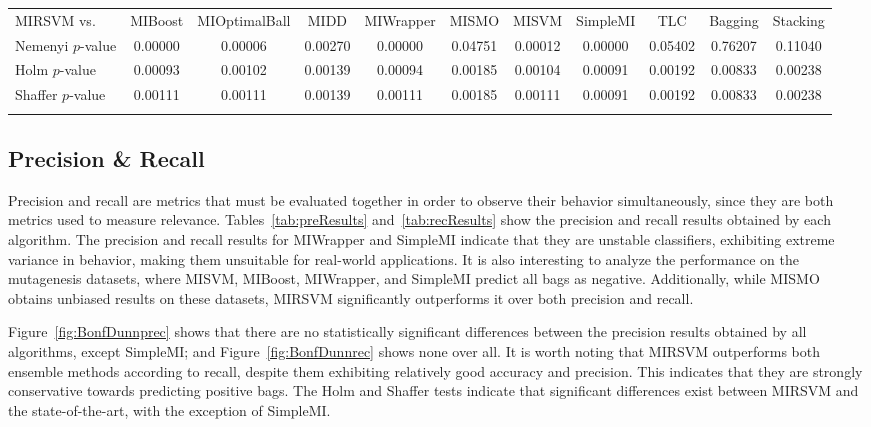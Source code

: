 \begin{table}[th!]
{}
\label{fig:BonfDunnacc}
\label{tab:statacc}
\scriptsize
\begin{tabularx}{\textwidth}{lcccccccccc}\noalign{\smallskip}\hline\noalign{\smallskip}
MIRSVM vs. & MIBoost & MIOptimalBall & MIDD & MIWrapper & MISMO & MISVM & SimpleMI & TLC & Bagging & Stacking\\
\noalign{\smallskip}\hline\noalign{\smallskip}
Nemenyi $p$-value & 0.00000 & 0.00006 & 0.00270 & 0.00000 & 0.04751 & 0.00012 & 0.00000 & 0.05402 & 0.76207 & 0.11040\\
Holm $p$-value & 0.00093 & 0.00102 & 0.00139 & 0.00094 & 0.00185 & 0.00104 & 0.00091 & 0.00192 & 0.00833 & 0.00238\\
Shaffer $p$-value & 0.00111 & 0.00111 & 0.00139 & 0.00111 & 0.00185 & 0.00111 & 0.00091 & 0.00192 & 0.00833 & 0.00238\\
\noalign{\smallskip}\hline\noalign{\smallskip}
\end{tabularx}
\end{table}
\newpage
\subsection{Precision \& Recall}
Precision and recall are metrics that must be evaluated together in order to observe their behavior simultaneously, since they are both metrics used to measure relevance. Tables~\ref{tab:preResults} and~\ref{tab:recResults} show the precision and recall results obtained by each algorithm. The precision and recall results for MIWrapper and SimpleMI indicate that they are unstable classifiers, exhibiting extreme variance in behavior, making them unsuitable for real-world applications. It is also interesting to analyze the performance on the mutagenesis datasets, where MISVM, MIBoost, MIWrapper, and SimpleMI predict all bags as negative. Additionally, while MISMO obtains unbiased results on these datasets, MIRSVM significantly outperforms it over both precision and recall.  

Figure~\ref{fig:BonfDunnprec} shows that there are no statistically significant differences between the precision results obtained by all algorithms, except SimpleMI; and Figure~\ref{fig:BonfDunnrec} shows none over all. It is worth noting that MIRSVM outperforms both ensemble methods according to recall, despite them exhibiting relatively good accuracy and precision. This indicates that they are strongly conservative towards predicting positive bags. The Holm and Shaffer tests indicate that significant differences exist between MIRSVM and the state-of-the-art, with the exception of SimpleMI. 

